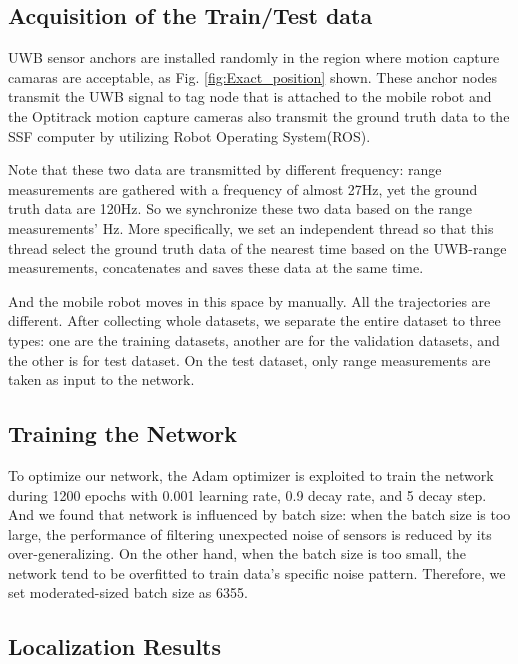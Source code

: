 \documentclass[letterpaper, 10 pt, conference]{ieeeconf}  %
\begin{document}
 
\subsection{Acquisition of the Train/Test data}
UWB sensor anchors are installed randomly in the region where motion capture camaras are acceptable, as Fig. \ref{fig:Exact_position} shown. These anchor nodes transmit the UWB signal to tag node that is attached to the mobile robot and the Optitrack motion capture cameras also transmit the ground truth data to the SSF computer by utilizing Robot Operating System(ROS).

Note that these two data are transmitted by different frequency: range measurements are gathered with a frequency of almost 27Hz, yet the ground truth data are 120Hz. So we synchronize these two data based on the range measurements' Hz. More specifically, we set an independent thread so that this thread select the ground truth data of the nearest time based on the UWB-range measurements, concatenates and saves these data at the same time.

And the mobile robot moves in this space by manually. All the trajectories are different. After collecting whole datasets, we separate the entire dataset to three types: one are the training datasets, another are for the validation datasets, and the other is for test dataset. On the test dataset, only range measurements are taken as input to the network.

\subsection{Training the Network}

To optimize our network, the Adam optimizer is exploited to train the
network during 1200 epochs with 0.001 learning rate, 0.9
decay rate, and 5 decay step. And we found that network is influenced by batch size: when the batch size is too large, the performance of filtering unexpected noise of sensors is reduced by its over-generalizing. On the other hand, when the batch size is too small, the network tend to be overfitted to train data's specific noise pattern. Therefore, we set moderated-sized batch size as 6355.
 

\subsection{Localization Results}
\end{document}
